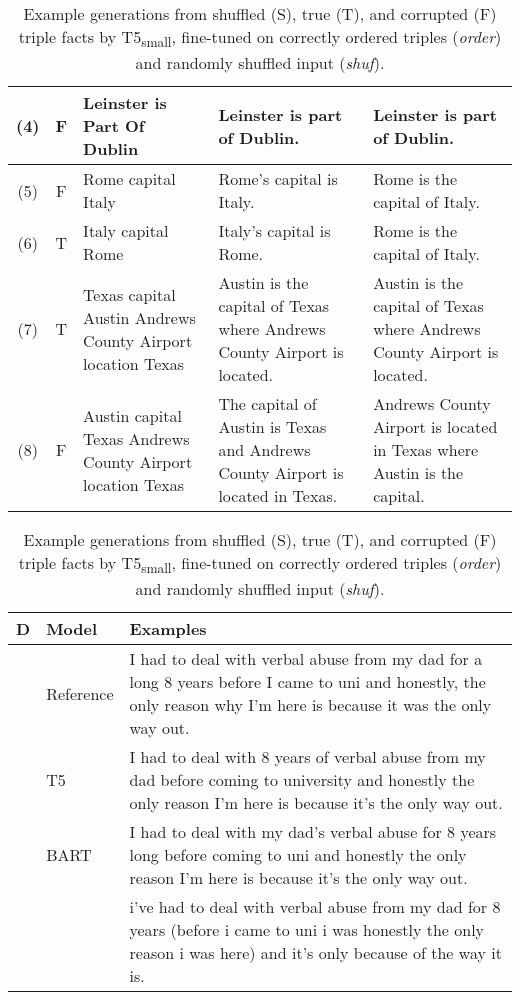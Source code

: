 \documentclass[11pt]{article}
\newcommand{\sep}{}
\newcommand{\vertmulticell}[2]{\multirow{#1}{*}{\rotatebox[origin=c]{90}{#2}}}
\begin{document}
\begin{table}[t]
\begin{table*}[t]
\begin{tabular}{@{\hspace{.1em}}c@{\hspace{.1em}}c@{\hspace{.8em}}p{5cm}@{\hspace{.8em}}p{4.5cm}@{\hspace{.8em}}p{4.5cm}@{\hspace{.8em}}}
         \midrule
                 (4) &F& \sep{} Leinster \sep{} is Part Of \sep{} Dublin & Leinster is part of Dublin. & Leinster is part of Dublin. \\
         \midrule
         (5) &F& \sep{} Rome \sep{} capital \sep{} Italy & Rome’s capital is Italy. & Rome is the capital of Italy. \\
         \midrule
         (6) &T& \sep{} Italy \sep{} capital \sep{} Rome & Italy’s capital is Rome. & Rome is the capital of Italy.\\
         \midrule
          (7) &T& \sep{} Texas \sep{} capital \sep{} Austin \sep{} Andrews County Airport \sep{} location \sep{} Texas & Austin is the capital of Texas where Andrews County Airport is located.  &  Austin is the capital of Texas where Andrews County Airport is located. \\
          \midrule
         (8) &F& \sep{} Austin \sep{} capital \sep{} Texas \sep{} Andrews County Airport \sep{} location \sep{} Texas  & The capital of Austin is Texas and Andrews County Airport is located in Texas. & Andrews County Airport is located in Texas where Austin is the capital.
  \\
\bottomrule
    \end{tabular}
    \caption{Example generations from shuffled (S), true (T), and corrupted (F) triple facts by T5\textsubscript{small}, fine-tuned on correctly ordered triples (\emph{order}) and randomly shuffled input (\emph{shuf}).}
    \label{tab:qualitative_appendix}
\end{table*} \begin{table*}[h]
\begin{center}
\begin{tabular}{llp{11cm}}
\toprule
\textbf{D}     & \textbf{Model}       & \textbf{Examples}    \\
\midrule
\vertmulticell{10}{AMR}  & Reference  & I had to deal with verbal abuse from my dad for a long 8 years before I came to uni and honestly, the only reason why I'm here is because it was the only way out. \\
 & T5 & I had to deal with 8 years of verbal abuse from my dad before coming to university and honestly the only reason I'm here is because it's the only way out. \\
 & BART & I had to deal with my dad's verbal abuse for 8 years long before coming to uni and honestly the only reason I'm here is because it's the only way out. \\
 & \citet{mager2020gpttoo} & i've had to deal with verbal abuse from my dad for 8 years (before i came to uni i was honestly the only reason i was here) and it's only because of the way it is. \\
 

\end{tabular}
\end{center}
\end{table*}
\end{table}
\end{document}
